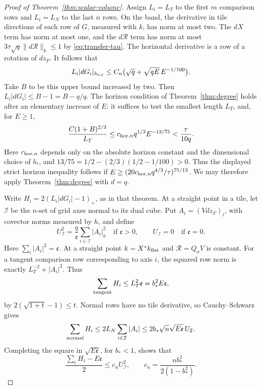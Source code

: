 \begin{proof}[Proof of Theorem~\ref{thm:scalar-volume}]
Assign \(L_i=L_T\) to the first \(m\) comparison rows and
\(L_i=L_N\) to the last \(n\) rows.  On the band, the derivative in
tile directions of each row of \(G\), measured with \(k\), has norm
at most two.  The \(dX\) term has norm at most one, and the
\(d\mathcal R\) term has norm at most
\(3\tau\sqrt q\|d\mathcal R\|_k\leq1\) by
\eqref{eq:transfer-tau}.  The horizontal derivative is a row of a
rotation of \(dz_F\).  It follows that
\[
 L_i|dG_i|_{h_{\rm tot}}
       \leq C_n\bigl(\sqrt q+\sqrt{qE}\,E^{-1/100}\bigr).
\]
Take \(B\) to be this upper bound increased by two.  Then
\(L_i|dG_i|\leq B-1=B-q/q\).  The horizon condition of
Theorem~\ref{thm:degree} holds after an elementary increase of \(E\):
it suffices to test the smallest length \(L_T\), and, for \(E\geq1\),
\[
       \frac{C(1+B)^{2/3}}{L_T}
          \leq c_{{\rm hor},n}q^{1/3}E^{-13/75}
          <\frac{\tau}{10q}.
\]
Here \(c_{{\rm hor},n}\) depends only on the absolute horizon constant
and the dimensional choice of \(b_*\), and
\(13/75=1/2-(2/3)(1/2-1/100)>0\).  Thus the displayed strict horizon
inequality follows if
\(E\geq(20c_{{\rm hor},n}q^{4/3}/\tau)^{75/13}\).
We may therefore apply Theorem~\ref{thm:degree}
with \(d=q\).

Write \(H_i=2(L_i|dG_i|-1)_+\), as in that theorem.  At a straight
point in a tile, let \(\mathcal I\) be the \(n\)-set of grid axes
normal to its dual cube.  Put \(A_i=(Vdz_F)_i\), with covector norms
measured by \(h\), and define
\begin{equation}\label{eq:transfer-U}
       U_{\mathcal I}^2=
        \frac q{\mathfrak e}\sum_{i\in\mathcal I}|A_i|_h^2
        \quad\text{if }\mathfrak e>0,
        \qquad U_{\mathcal I}=0\quad\text{if }\mathfrak e=0.
\end{equation}
Here \(\sum_i|A_i|^2=\mathfrak e\).  At a straight point
\(k=X^*k_{\rm flat}\) and \(\mathcal R=Q_\sigma V\) is constant.
For a tangent comparison row corresponding to axis \(i\), the squared
row norm is exactly \(L_T^{-2}+|A_i|^2\).  Thus
\[
  \sum_{\rm tangent}H_i
      \leq L_T^2\mathfrak e=b_*^2E\mathfrak e,
\]
by \(2(\sqrt{1+t}-1)\leq t\).  Normal rows have no tile derivative,
so Cauchy--Schwarz gives
\[
  \sum_{\rm normal}H_i
    \leq2L_N\sum_{i\in\mathcal I}|A_i|
    \leq2b_*\sqrt n\sqrt{E\mathfrak e}\,U_{\mathcal I}.
\]
Completing the square in \(\sqrt{E\mathfrak e}\), for \(b_*<1\),
shows that
\begin{equation}\label{eq:transfer-straight-penalty}
       \frac{\sum_iH_i-E\mathfrak e}{2}
          \leq c_n U_{\mathcal I}^2,
       \qquad c_n=\frac{n b_*^2}{2(1-b_*^2)}.
\end{equation}


\end{proof}
